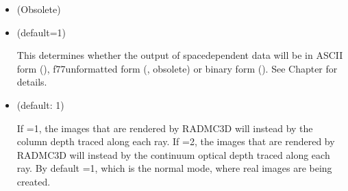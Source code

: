 \documentclass[letterpaper,10pt,english]{sphinxmanual}
\begin{document}
\begin{itemize}
When  reads the dust opacity files it checks if one or more of the
opacity files has scattering opacity included. If yes, the 
will automatically be set to 1. It will also check if one or more includes
 scattering. If yes, the  will automatically
be set to 2. But the user  nevertheless want to exclude anisotropic
scattering or exclude scattering altogether (for instance for testing
purposes, or if the user knows from experience that the scattering or
anisotropic nature of scattering is not important for the problem at
hand). Rather than editing the opacity files to remove the scattering and/or
Henyey\sphinxhyphen{}Greenstein \(g\)\sphinxhyphen{}factors, you can limit the value that 
is allowed to make  by setting the variable
. If you set  then no matter
what opacity files you have, scattering will not be treated.  If you set
, then no matter what opacity files you have,
scattering will be treated in an isotropic way.

\item {} 
 (Obsolete)

\item {} 
 (default=1)

This determines whether the output of space\sphinxhyphen{}dependent data will be in ASCII
form (), f77\sphinxhyphen{}unformatted form (, obsolete)
or binary form ().  See Chapter {\hyperref[\detokenize{binaryio:chap-binary-io}]{}} for
details.

\item {} 
 (default: 1)

If =\sphinxhyphen{}1, the images that are rendered by RADMC\sphinxhyphen{}3D will
instead by the column depth traced along each ray.  If =\sphinxhyphen{}2, the images that are rendered by RADMC\sphinxhyphen{}3D will instead by the continuum
optical depth traced along each ray.  By default =1,
which is the normal mode, where real images are being created.


\end{itemize}
\end{document}

